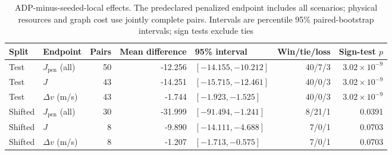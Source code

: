 \begin{table}[t]
  \centering
  \caption{ADP-minus-seeded-local effects. The predeclared penalized endpoint includes all scenarios; physical resources and graph cost use jointly complete pairs. Intervals are percentile 95\% paired-bootstrap intervals; sign tests exclude ties}
  \label{tab:required-paired}
  \renewcommand{\arraystretch}{1.08}
  \setlength{\tabcolsep}{5pt}
  \footnotesize
  \begin{tabular}{@{}llrrlrr@{}}
    \toprule
    Split & Endpoint & Pairs & Mean difference & 95\% interval & Win/tie/loss & Sign-test $p$ \\
    \midrule
    Test & $J_{\mathrm{pen}}$ (all) & 50 & -12.256 & $[-14.155,-10.212]$ & 40/7/3 & $3.02\times10^{-9}$ \\
    Test & $J$ & 43 & -14.251 & $[-15.715,-12.461]$ & 40/0/3 & $3.02\times10^{-9}$ \\
    Test & $\Delta v$ (m/s) & 43 & -1.744 & $[-1.923,-1.525]$ & 40/0/3 & $3.02\times10^{-9}$ \\
    Shifted & $J_{\mathrm{pen}}$ (all) & 30 & -31.999 & $[-91.494,-1.241]$ & 8/21/1 & 0.0391 \\
    Shifted & $J$ & 8 & -9.890 & $[-14.111,-4.688]$ & 7/0/1 & 0.0703 \\
    Shifted & $\Delta v$ (m/s) & 8 & -1.207 & $[-1.713,-0.575]$ & 7/0/1 & 0.0703 \\
    \bottomrule
  \end{tabular}
\end{table}
